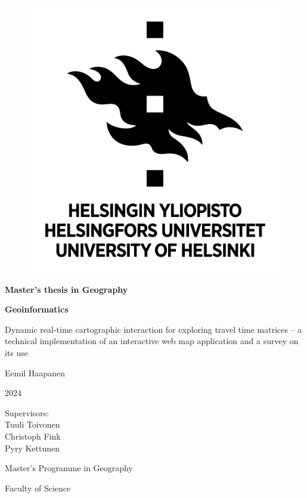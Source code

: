 \begin{center}{
    \begin{figure}[H]
        \centering
        \includegraphics[scale=0.4]{visual/other/helsinki_uni_logo.jpg}
    \end{figure}

    \bigskip
    \bigskip
    \bigskip
    \textbf{Master's thesis in Geography} \par
    \textbf{Geoinformatics} \par

    \bigskip
    \bigskip
    Dynamic real-time cartographic interaction for exploring travel time matrices --
    a technical implementation of an interactive web map application and a survey on its use

    \bigskip
    \bigskip
    Eemil Haapanen

    2024

    \vfill

    Supervisors: \\
    Tuuli Toivonen \\
    Christoph Fink \\
    Pyry Kettunen \par
    \bigskip
    \bigskip
    \bigskip
    Master's Programme in Geography \par
    Faculty of Science \par
}
\end{center}
